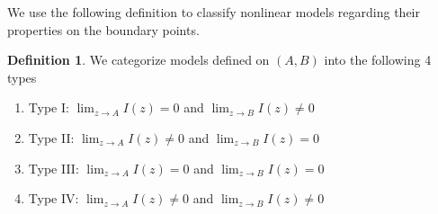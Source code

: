 \documentclass[11pt]{amsart}
\newtheorem{lemma}[theorem]{Lemma}
\theoremstyle{definition}
\newtheorem{definition}{Definition}[section]
\theoremstyle{remark}
\numberwithin{equation}{section}
\begin{document}
We use the following definition to classify nonlinear models regarding their properties on the boundary points. 
\begin{definition} We categorize models defined on $(A,B)$ into the following 4 types\begin{enumerate}
    \item Type I: $\lim_{z\to A}I(z)=0$ and $\lim_{z\to B}I(z)\ne 0$
    \item Type II: $\lim_{z\to A}I(z)\ne 0$ and $\lim_{z\to B}I(z)=0$
    \item Type III: $\lim_{z\to A}I(z)= 0$ and $\lim_{z\to B}I(z)=0$
    \item Type IV: $\lim_{z\to A}I(z)\ne 0$ and $\lim_{z\to B}I(z)\ne0$
\end{enumerate}
\end{definition}



\end{document}
